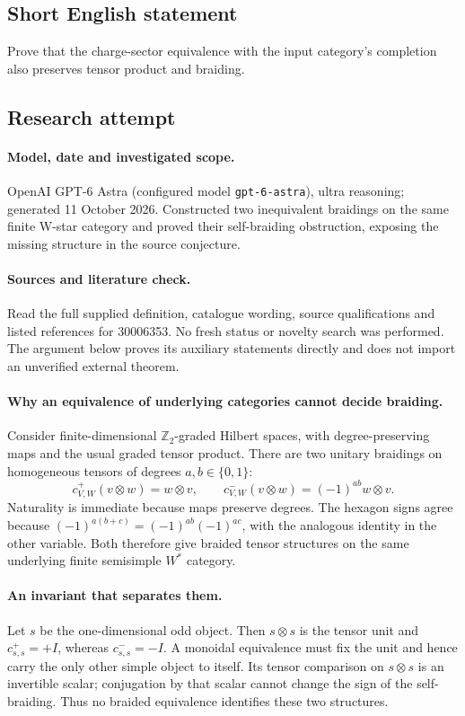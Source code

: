\documentclass[11pt]{article}
\begin{document}
\subsection{Short English statement}
Prove that the charge-sector equivalence with the input category's completion also preserves tensor product and braiding.
\subsection{Research attempt}
\paragraph{Model, date and investigated scope.}
OpenAI GPT-6 Astra (configured model \texttt{gpt-6-astra}), ultra reasoning; generated 11 October 2026. Constructed two inequivalent braidings on the same finite W-star category and proved their self-braiding obstruction, exposing the missing structure in the source conjecture.

\paragraph{Sources and literature check.}
Read the full supplied definition, catalogue wording, source qualifications and listed references for 30006353. No fresh status or novelty search was performed. The argument below proves its auxiliary statements directly and does not import an unverified external theorem.

\paragraph{Why an equivalence of underlying categories cannot decide braiding.} Consider finite-dimensional \(\mathbb Z_2\)-graded Hilbert spaces, with degree-preserving maps and the usual graded tensor product. There are two unitary braidings on homogeneous tensors of degrees \(a,b\in\{0,1\}\):
\[
 c^+_{V,W}(v\otimes w)=w\otimes v,
 \qquad c^-_{V,W}(v\otimes w)=(-1)^{ab}w\otimes v.
\]
Naturality is immediate because maps preserve degrees. The hexagon signs agree because \((-1)^{a(b+c)}=(-1)^{ab}(-1)^{ac}\), with the analogous identity in the other variable. Both therefore give braided tensor structures on the same underlying finite semisimple \(W^*\) category.
\paragraph{An invariant that separates them.} Let \(s\) be the one-dimensional odd object. Then \(s\otimes s\) is the tensor unit and \(c^+_{s,s}=+I\), whereas \(c^-_{s,s}=-I\). A monoidal equivalence must fix the unit and hence carry the only other simple object to itself. Its tensor comparison on \(s\otimes s\) is an invertible scalar; conjugation by that scalar cannot change the sign of the self-braiding. Thus no braided equivalence identifies these two structures.
\end{document}
